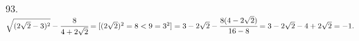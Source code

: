93. $\sqrt{(2\sqrt{2}-3)^2}-\cfrac{8}{4+2\sqrt{2}}=[(2\sqrt{2})^2=8<9=3^2]=3-2\sqrt{2}-\cfrac{8(4-2\sqrt{2})}{16-8}=
3-2\sqrt{2}-4+2\sqrt{2}=-1.$\\
